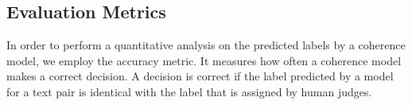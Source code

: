 \subsection{Evaluation Metrics}

In order to perform a quantitative analysis on the predicted labels by a coherence model, we employ the accuracy metric. 
It measures how often a coherence model makes a correct decision. 
A decision is correct if the label predicted by a model for a text pair is identical with the label that is assigned by human judges. 











